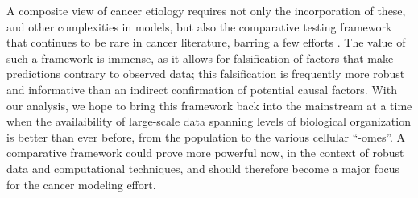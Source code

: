 \documentclass[9pt,twocolumn,twoside]{pnas-new}
\begin{document}
A composite view of cancer etiology requires not only the incorporation of these, and other complexities in models, but also the comparative testing framework that continues to be rare in cancer literature, barring a few efforts \cite{Frank2007}. The value of such a framework is immense, as it allows for falsification of factors that make predictions contrary to observed data; this falsification is frequently more robust and informative than an indirect confirmation of potential causal factors. With our analysis, we hope to bring this framework back into the mainstream at a time when the availaibility of large-scale data spanning levels of biological organization is better than ever before, from the population to the various cellular ``-omes''. A comparative framework could prove more powerful now, in the context of robust data and computational techniques, and should therefore become a major focus for the cancer modeling effort.






\end{document}
